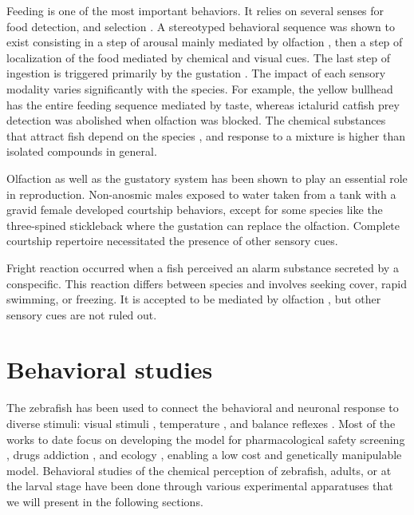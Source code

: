     Feeding is one of the most important behaviors. It relies on several senses for food detection, and selection \cite{pavlov1990sensory}. A stereotyped behavioral sequence was shown to exist \cite{atema1980chemical} consisting in a step of arousal mainly mediated by olfaction \cite{bateson1890sense}, then a step of localization of the food mediated by chemical and visual cues. The last step of ingestion is triggered primarily by the gustation \cite{atema1980chemical}. The impact of each sensory modality varies significantly with the species. For example, the yellow bullhead has the entire feeding sequence mediated by taste, whereas ictalurid catfish prey detection was abolished when olfaction was blocked. The chemical substances that attract fish depend on the species \cite{atema1980chemical}, and response to a mixture is higher than isolated compounds in general.

    Olfaction \cite{tavolga1956visual} as well as the gustatory system \cite{de1983influence} has been shown to play an essential role in reproduction. Non-anosmic males exposed to water taken from a tank with a gravid female developed courtship behaviors, except for some species like the three-spined stickleback where the gustation can replace the olfaction. Complete courtship repertoire necessitated the presence of other sensory cues.

    Fright reaction occurred when a fish perceived an alarm substance secreted by a conspecific. This reaction differs between species and involves seeking cover, rapid swimming, or freezing. It is accepted to be mediated by olfaction \cite{frisch1942schreckstoff,speedie2008alarm,doving2009alarm}, but other sensory cues are not ruled out.


  \section{Behavioral studies}
  The zebrafish has been used to connect the behavioral and neuronal response to diverse stimuli: visual stimuli \cite{}, temperature \cite{}, and balance reflexes \cite{}. Most of the works to date focus on developing the model for pharmacological safety screening \cite{cassar2019use}, drugs addiction \cite{klee2012zebrafish}, and ecology \cite{dai2014zebrafish}, enabling a low cost and genetically manipulable model. Behavioral studies of the chemical perception of zebrafish, adults, or at the larval stage have been done through various experimental apparatuses that we will present in the following sections.

